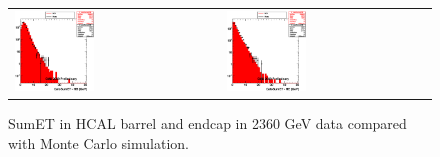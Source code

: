 \begin{figure}[h!]
 \centering
 \begin{tabular}{ll}
  \includegraphics[width=0.40\textwidth]{plots_DataVsMC_MB_2360GeV/h_caloSumetHB.eps} &
  \includegraphics[width=0.40\textwidth]{plots_DataVsMC_MB_2360GeV/h_caloSumetHE.eps} \\
 \end{tabular}
 \caption{SumET in HCAL barrel and endcap in 2360 GeV data compared
   with Monte Carlo simulation.
          \label{fig:DataVsMC_MB_2360_5}}
\end{figure}

